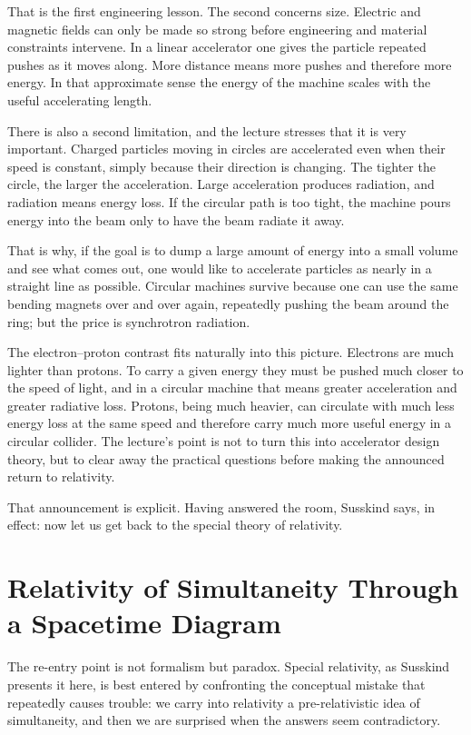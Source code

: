 That is the first engineering lesson. The second concerns size. Electric and magnetic fields can only be made so strong before engineering and material constraints intervene. In a linear accelerator one gives the particle repeated pushes as it moves along. More distance means more pushes and therefore more energy. In that approximate sense the energy of the machine scales with the useful accelerating length.

There is also a second limitation, and the lecture stresses that it is very important. Charged particles moving in circles are accelerated even when their speed is constant, simply because their direction is changing. The tighter the circle, the larger the acceleration. Large acceleration produces radiation, and radiation means energy loss. If the circular path is too tight, the machine pours energy into the beam only to have the beam radiate it away.

That is why, if the goal is to dump a large amount of energy into a small volume and see what comes out, one would like to accelerate particles as nearly in a straight line as possible. Circular machines survive because one can use the same bending magnets over and over again, repeatedly pushing the beam around the ring; but the price is synchrotron radiation.

The electron--proton contrast fits naturally into this picture. Electrons are much lighter than protons. To carry a given energy they must be pushed much closer to the speed of light, and in a circular machine that means greater acceleration and greater radiative loss. Protons, being much heavier, can circulate with much less energy loss at the same speed and therefore carry much more useful energy in a circular collider. The lecture's point is not to turn this into accelerator design theory, but to clear away the practical questions before making the announced return to relativity.

That announcement is explicit. Having answered the room, Susskind says, in effect: now let us get back to the special theory of relativity.

\section{Relativity of Simultaneity Through a Spacetime Diagram}

The re-entry point is not formalism but paradox. Special relativity, as Susskind presents it here, is best entered by confronting the conceptual mistake that repeatedly causes trouble: we carry into relativity a pre-relativistic idea of simultaneity, and then we are surprised when the answers seem contradictory.

